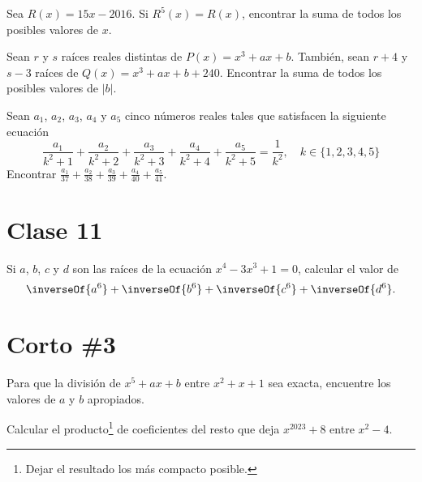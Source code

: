 \begin{section-problem}
    Sea $R(x) = 15x - 2016$.
    Si $R^5(x) = R(x)$, encontrar la suma de todos los posibles valores de $x$.
\end{section-problem}

\begin{section-problem}
    Sean $r$ y $s$ raíces reales distintas de $P(x) = x^3 + ax + b$.
    También, sean $r + 4$ y $s - 3$ raíces de $Q(x) = x^3 + ax + b + 240$.
    Encontrar la suma de todos los posibles valores de $|b|$.
\end{section-problem}

\begin{section-problem}
    Sean $a_1$, $a_2$, $a_3$, $a_4$ y $a_5$ cinco números reales tales que satisfacen la siguiente ecuación
    \[\frac{a_1}{k^2 + 1} + \frac{a_2}{k^2 + 2} + \frac{a_3}{k^2 + 3} + \frac{a_4}{k^2 + 4} + \frac{a_5}{k^2 + 5} = \frac{1}{k^2}, \quad k \in \{1, 2, 3, 4, 5\}\]
    Encontrar $\frac{a_1}{37} + \frac{a_2}{38} + \frac{a_3}{39} + \frac{a_4}{40} + \frac{a_5}{41}$.
\end{section-problem}

\section{Clase 11}

    \begin{section-problem}
        Si $a$, $b$, $c$ y $d$ son las raíces de la ecuación $x^4 - 3x^3 + 1 = 0$,
        calcular el valor de
        \[\inverseOf{a^6} + \inverseOf{b^6} + \inverseOf{c^6} + \inverseOf{d^6}.\]
    \end{section-problem}


\section{Corto \#3}

    \begin{section-problem}
        Para que la división de $x^5 + ax + b$ entre $x^2 + x + 1$ sea exacta, encuentre los valores de $a$ y $b$ apropiados.
    \end{section-problem}

    \begin{section-problem}
        Calcular el producto\footnote{Dejar el resultado los más compacto posible.} de coeficientes del resto que deja $x^{2023} + 8$ entre $x^2 - 4$.
    \end{section-problem}

